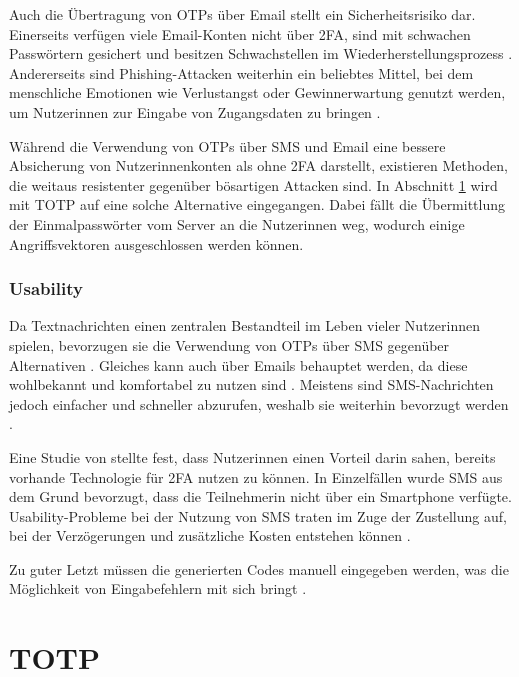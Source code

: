 Auch die Übertragung von \acp{OTP} über Email stellt ein Sicherheitsrisiko dar. Einerseits verfügen viele Email-Konten nicht über \ac{2FA}, sind mit schwachen Passwörtern gesichert und besitzen Schwachstellen im Wiederherstellungsprozess \parencite{khannaAnatomyCompromising2012}. Andererseits sind Phishing-Attacken weiterhin ein beliebtes Mittel, bei dem menschliche Emotionen wie Verlustangst oder Gewinnerwartung genutzt werden, um Nutzerinnen zur Eingabe von Zugangsdaten zu bringen \parencite{goelGotPhished2017}.

\pskip
Während die Verwendung von \acp{OTP} über SMS und Email eine bessere Absicherung von Nutzerinnenkonten als ohne \ac{2FA} darstellt, existieren Methoden, die weitaus resistenter gegenüber bösartigen Attacken sind. In Abschnitt \ref{sec:totp} wird mit \ac{TOTP} auf eine solche Alternative eingegangen. Dabei fällt die Übermittlung der Einmalpasswörter vom Server an die Nutzerinnen weg, wodurch einige Angriffsvektoren ausgeschlossen werden können.

\subsubsection{Usability}

Da Textnachrichten einen zentralen Bestandteil im Leben vieler Nutzerinnen spielen, bevorzugen sie die Verwendung von \acp{OTP} über SMS gegenüber Alternativen \parencite{peetersSMSOTP2022}. Gleiches kann auch über Emails behauptet werden, da diese wohlbekannt und komfortabel zu nutzen sind \parencite{vishwakarmaSecureImage2016}. Meistens sind SMS-Nachrichten jedoch einfacher und schneller abzurufen, weshalb sie weiterhin bevorzugt werden \parencite{peetersSMSOTP2022}.

Eine Studie von \textcite{decristofaroComparativeUsability2014} stellte fest, dass Nutzerinnen einen Vorteil darin sahen, bereits vorhande Technologie für \ac{2FA} nutzen zu können. In Einzelfällen wurde SMS aus dem Grund bevorzugt, dass die Teilnehmerin nicht über ein Smartphone verfügte. Usability-Probleme bei der Nutzung von SMS traten im Zuge der Zustellung auf, bei der Verzögerungen und zusätzliche Kosten entstehen können \parencite{decristofaroComparativeUsability2014}.

Zu guter Letzt müssen die generierten Codes manuell eingegeben werden, was die Möglichkeit von Eingabefehlern mit sich bringt \parencite{decristofaroComparativeUsability2014}.

\section{TOTP}
\label{sec:totp}

